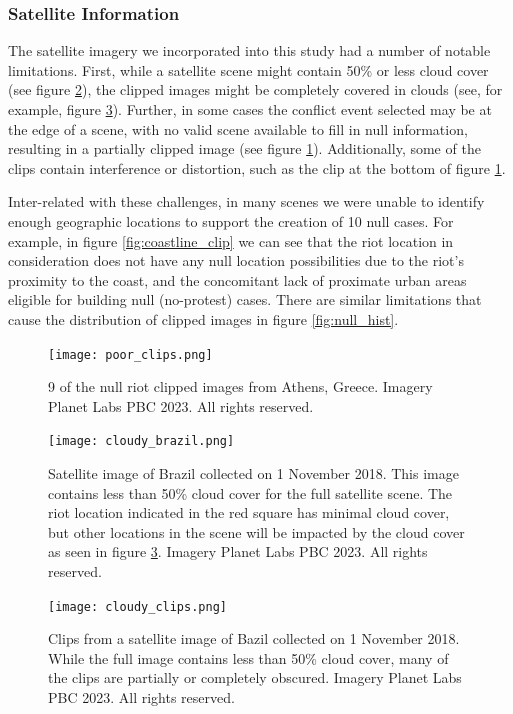 \subsubsection{Satellite Information} \label{sec:limits.satinfo}
The satellite imagery we incorporated into this study had a number of notable limitations. First, while a satellite scene might contain 50\% or less cloud cover (see figure \ref{fig:cloudy_brazil}), the clipped images might be completely covered in clouds (see, for example, figure \ref{fig:cloudy_clips}).  Further, in some cases the conflict event selected may be at the edge of a scene, with no valid scene available to fill in null information, resulting in a partially clipped image (see figure \ref{fig:poorclips}).  Additionally, some of the clips contain interference or distortion, such as the clip at the bottom of figure \ref{fig:poorclips}.

Inter-related with these challenges, in many scenes we were unable to identify enough geographic locations to support the creation of 10 null cases. For example, in figure \ref{fig:coastline_clip} we can see that the riot location in consideration does not have any null location possibilities due to the riot's proximity to the coast, and the concomitant lack of proximate urban areas eligible for building null (no-protest) cases. There are similar limitations that cause the distribution of clipped images in figure \ref{fig:null_hist}.
\begin{figure}
    \centering
    \texttt{[image: poor\_clips.png]}
    \caption{9 of the null riot clipped images from Athens, Greece. Imagery \textcopyright Planet Labs PBC 2023. All rights reserved.}
    \label{fig:poorclips}
\end{figure}

\begin{figure}
    \centering
    \texttt{[image: cloudy\_brazil.png]}
    \caption{Satellite image of Brazil collected on 1 November 2018.  This image contains less than 50\% cloud cover for the full satellite scene.  The riot location indicated in the red square has minimal cloud cover, but other locations in the scene will be impacted by the cloud cover as seen in figure \ref{fig:cloudy_clips}. Imagery \textcopyright Planet Labs PBC 2023. All rights reserved.}
    \label{fig:cloudy_brazil}
\end{figure}

\begin{figure}
    \centering
    \texttt{[image: cloudy\_clips.png]}
    \caption{Clips from a satellite image of Bazil collected on 1 November 2018.  While the full image contains less than 50\% cloud cover, many of the clips are partially or completely obscured. Imagery \textcopyright Planet Labs PBC 2023. All rights reserved.}
    \label{fig:cloudy_clips}
\end{figure}

